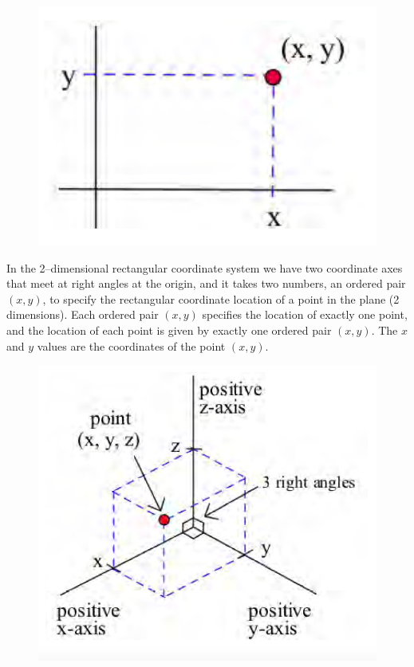 \begin{figure}

\includegraphics[scale=0.6]{images/twoVariables/2dimGraph.png}
\caption{ }
\label{fig:2dimGraph}
\end{figure}
\noindent In the 2–dimensional rectangular coordinate system we have two coordinate axes that meet at right angles at the origin, and it takes two numbers, an ordered pair $(x, y)$, to specify the rectangular coordinate location of a point in the plane (2 dimensions). Each ordered pair $(x, y)$ specifies the location of exactly one point, and the location of each point is given by exactly one ordered pair $(x, y)$. The $x$ and $y$ values are the coordinates of the point $(x, y)$.\\

\begin{figure}

\includegraphics[scale=0.45]{images/twoVariables/3dimGraph.png}
\caption{ }
\label{fig:3dimGraph}
\end{figure}

